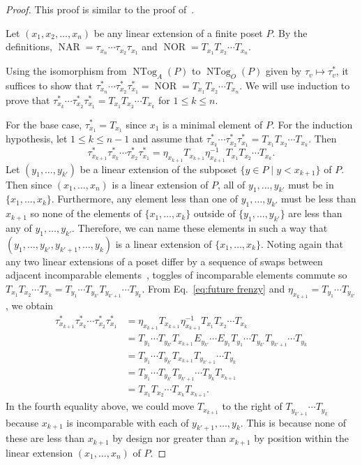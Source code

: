 \documentclass[10pt]{amsart}
\theoremstyle{definition}
\DeclareMathOperator{\ntog}{NTog}
\DeclareMathOperator{\NAR}{NAR}
\DeclareMathOperator{\NOR}{NOR}
\begin{document}
\begin{proof}
This proof is similar to the proof
of~\cite[Theorem 3.21]{antichain-toggling}.

Let $(x_1,x_2,\dots,x_n)$ be any linear extension of a finite poset $P$. By the definitions,
$\NAR=\tau_{x_n}\cdots \tau_{x_2}\tau_{x_1}$
and
$\NOR=T_{x_1} T_{x_2} \cdots T_{x_n}$.

Using the isomorphism from $\ntog_A(P)$ to $\ntog_O(P)$ given by $\tau_v \mapsto \tau_v^*$,
it suffices to show that
$\tau_{x_n}^*\cdots \tau_{x_2}^* \tau_{x_1}^*=\NOR = T_{x_1} T_{x_2} \cdots T_{x_n}$.
We will use induction to prove that $\tau_{x_k}^*\cdots \tau_{x_2}^* \tau_{x_1}^*
=T_{x_1} T_{x_2} \cdots T_{x_k}$ for $1\leq k\leq n$.

For the base case, $\tau_{x_1}^*=T_{x_1}$ since $x_1$ is a minimal element of $P$.
For the induction hypothesis, let $1\leq k\leq n-1$ and assume that
$\tau_{x_k}^*\cdots \tau_{x_2}^* \tau_{x_1}^*
=T_{x_1} T_{x_2} \cdots T_{x_k}$.
Then 
\begin{equation}\label{eq:future frenzy}
\tau_{x_{k+1}}^*\tau_{x_k}^*\cdots \tau_{x_2}^* \tau_{x_1}^*
= \eta_{x_{k+1}} T_{x_{k+1}} \eta_{x_{k+1}}^{-1} T_{x_1} T_{x_2} \cdots T_{x_k}.
\end{equation}
Let $(y_1,\dots,y_{k'})$ be a linear extension of the subposet $\{y\in P \;|\; y<x_{k+1}\}$ of $P$.
Then since $(x_1,\dots,x_n)$ is a linear extension of $P$, all of $y_1,\dots,y_{k'}$ must be in $\{x_1,\dots,x_k\}$.
Furthermore, any element less than one of $y_1,\dots,y_{k'}$ must be less than $x_{k+1}$ so none of the elements of $\{x_1,\dots,x_k\}$ outside of $\{y_1,\dots,y_{k'}\}$ are less than any of $y_1,\dots,y_{k'}$.
Therefore, we can name these elements in such a way that $(y_1,\dots,y_{k'}, y_{k'+1}, \dots, y_k)$ is a linear extension of $\{x_1,\dots,x_k\}$.
Noting again that any two linear extensions of a poset differ by a sequence of swaps between
adjacent incomparable elements~\cite{etienne-84}, 
toggles of incomparable elements commute so $T_{x_1}T_{x_2}\cdots T_{x_k} = T_{y_1}\cdots T_{y_{k'}}T_{y_{k'+1}}\cdots T_{y_k}$.
From Eq.~\eqref{eq:future frenzy} and $\eta_{x_{k+1}}=T_{y_1}\cdots T_{y_{k'}}$, we obtain
\begin{align*}
\tau_{x_{k+1}}^*\tau_{x_k}^*\cdots \tau_{x_2}^* \tau_{x_1}^* &=
\eta_{x_{k+1}} T_{x_{k+1}} \eta_{x_{k+1}}^{-1}
T_{x_1} T_{x_2} \cdots T_{x_k}
\\&=
T_{y_1}\cdots T_{y_{k'}} T_{x_{k+1}} E_{y_{k'}}\cdots E_{y_1} T_{y_1}\cdots T_{y_{k'}}T_{y_{k'+1}}\cdots T_{y_k}
\\&=
T_{y_1}\cdots T_{y_{k'}} T_{x_{k+1}} T_{y_{k'+1}}\cdots T_{y_k}
\\&=
T_{y_1}\cdots T_{y_{k'}} T_{y_{k'+1}}\cdots T_{y_k} T_{x_{k+1}}
\\&=
T_{x_1} T_{x_2} \cdots T_{x_k} T_{x_{k+1}}.
\end{align*}
In the fourth equality above, we could move $T_{x_{k+1}}$ to the right of $T_{y_{k'+1}}\cdots T_{y_k}$ because $x_{k+1}$ is incomparable with each of $y_{k'+1},\dots, y_k$. This is because none of these are less than $x_{k+1}$ by design nor greater than $x_{k+1}$ by position within the linear extension $(x_1,\dots,x_n)$ of $P$.


\end{proof}
\end{document}
